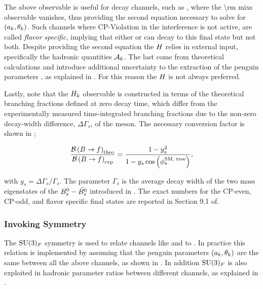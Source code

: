 \noindent The above observable is useful for decay channels, such as \BsJpsiKst, where the \Acp{\rm mix} observable vanishes,
thus providing the second equation necessary to solve for $(a_k,\theta_k)$. Such channels
where CP-Violation in the interference is not active, are called {\it flavor specific}, implying
that either \Bs or \Bsb can decay to this final state but not both.
Despite providing the second equation the $H_{}$ relies in external input, specifically the hadronic quantities $\mathcal{A}_{k}$.
The last come from theoretical calculations and introduce additional uncertainty to the extraction of the penguin parameters
, as explained in . For this reason the $H_{}$ is not always preferred.

Lastly, note that the $H_{k}$ observable is constructed in terms of the theoretical branching fractions
defined at zero decay time, which differ from the experimentally measured time-integrated branching fractions\cite{DeBruyn:2012wj}
due to the non-zero decay-width difference, $\Delta\Gamma_s$, of the \Bs meson\cite{hfag-2014}. The necessary conversion factor
is shown in ;

\begin{equation}
  \centering
  \frac{\BRof{\B\to f}_{\rm theo}}{\BRof{\B\to f}_{\rm exp}} = \frac{1-y_s^2}{1-y_s\cos\parenthesis{\phiS{\rm SM, tree}}},
  \label{br_conversion_formula}
\end{equation}

\noindent with $y_s = \Delta\Gamma_s / \Gamma_s$. The parameter $\Gamma_s$ is the average decay width of the two
mass eigenstates of the $B^0_s-\bar{B^0_s}$ introduced in . The exact numbers for the CP-even,
CP-odd, and flavor specific final states are reported in Section 9.1 of\cite{bsjpsikst-paper}.

\subsubsection{Invoking \grpsuthree Symmetry}
The $\mathrm{SU}(3)_{F}$ symmetry is used to relate channels like \BsJpsiKst and \BsJpsiRho to \BsJpsiPhi.
In practice this relation is implemented by assuming that the penguin parameters $(a_k,\theta_k)$
are the same between all the above channels, as shown in . In addition $\mathrm{SU}(3)_{F}$
is also exploited in hadronic parameter ratios between different channels, as explained in .
